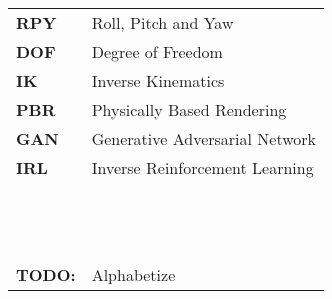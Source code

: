 \begin{table}[!hb]
\begin{tabular}{ll}
        \textbf{RPY}   & Roll, Pitch and Yaw                                        \\
        \textbf{DOF}   & Degree of Freedom                                          \\
        \textbf{IK}    & Inverse Kinematics                                         \\
        \textbf{PBR}   & Physically Based Rendering                                 \\
        \textbf{GAN}   & Generative Adversarial Network                             \\
        \textbf{IRL}   & Inverse Reinforcement Learning                             \\
        \textbf{}      &                                                            \\
        \textbf{}      &                                                            \\
        \textbf{}      &                                                            \\
        \textbf{}      &                                                            \\
        \textbf{}      &                                                            \\
        \textbf{}      &                                                            \\
        \textbf{}      &                                                            \\
        \textbf{}      &                                                            \\
        \textbf{}      &                                                            \\
        \textbf{}      &                                                            \\
        \textbf{}      &                                                            \\
        \textbf{}      &                                                            \\
        \textbf{}      &                                                            \\
        \textbf{TODO:} & Alphabetize                                                \\
    \end{tabular}
\end{table}
\capstarttrue
